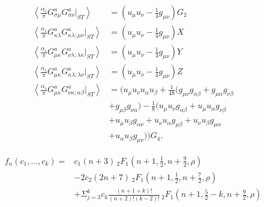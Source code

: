 \documentclass[aps,prc,superscriptaddress,showpacs,floatfix, nofootinbib,preprintnumbers,twocolumn]{revtex4}
\begin{document}
\begin{small}
\begin{align}
\left\langle \frac{\alpha_s}{\pi}G^a_{\sigma\mu} G^a_{\sigma\nu} |_{ST}\right\rangle & =(u_\mu u_\nu -\frac{1}{4}g_{\mu\nu})G_2\nonumber\\
\left\langle \frac{\alpha_s}{\pi}G^a_{\kappa\lambda} G^a_{\kappa\lambda;\mu\nu}|_{ST} \right\rangle & =(u_\mu u_\nu -\frac{1}{4}g_{\mu\nu})X\nonumber\\
 \left\langle \frac{\alpha_s}{\pi}G^a_{\mu\kappa} G^a_{\nu\lambda;\lambda\kappa}|_{ST} \right\rangle & =(u_\mu u_\nu -\frac{1}{4}g_{\mu\nu})Y\nonumber\\
 \left\langle \frac{\alpha_s}{\pi}G^a_{\mu\kappa} G^a_{\kappa\lambda;\lambda\nu}|_{ST} \right\rangle & =(u_\mu u_\nu -\frac{1}{4}g_{\mu\nu})Z\nonumber\\
\left\langle \frac{\alpha_s}{\pi}G^a_{\mu\kappa} G^a_{\nu\kappa;\alpha\beta}|_{ST} \right\rangle & =(u_\mu u_\nu u_\alpha u_\beta+\frac{1}{48}(g_{\mu\nu}g_{\alpha\beta}+g_{\mu\alpha}g_{\nu\beta} \nonumber\\
&+g_{\mu\beta} g_{\nu\alpha}) -\frac{1}{8}(u_\mu u_\nu g_{\alpha\beta}+u_\mu u_\alpha g_{\nu\beta}\nonumber\\
&+u_\mu u_\beta g_{\alpha\nu}+u_\nu u_\alpha g_{\mu\beta} + u_\nu u_\beta g_{\mu\alpha} \nonumber\\
&+ u_\alpha u_\beta g_{\mu\nu}))G_4.
\end{align}
\end{small}
\begin{scriptsize}
\begin{align}
f_n(c_1,...,c_k)=&c_1(n+3)\,_2F_1(n+1,\frac{1}{2},n+\frac{9}{2},\rho)\nonumber\\
&-2c_2(2n+7)\,_2F_1(n+1,\frac{1}{2},n+\frac{7}{2},\rho)\nonumber\\
&+\Sigma_{j=3}^{k}c_k\frac{(n+1+k)!}{(n+2)!(k-2)!}\,_2F_1(n+1,\frac{5}{2}-k,n+\frac{9}{2},\rho)
\end{align}
\end{scriptsize}
\end{document}
